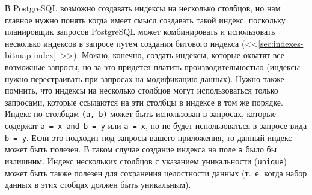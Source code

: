 В PostgreSQL возможно создавать индексы на несколько столбцов, но нам главное нужно понять когда имеет смысл создавать такой индекс, поскольку планировщик запросов PostgreSQL может комбинировать и использовать несколько индексов в запросе путем создания битового индекса (<<\ref{sec:indexes-bitmap-index}~>>). Можно, конечно, создать индексы, которые охватят все возможные запросы, но за это придется платить производительностью (индексы нужно перестраивать при запросах на модификацию данных). Нужно также помнить, что индексы на несколько столбцов могут использоваться только запросами, которые ссылаются на эти столбцы в индексе в том же порядке. Индекс по столбцам \lstinline!(a, b)! может быть использован в запросах, которые содержат \lstinline!a = x and b = y! или \lstinline!a = x!, но не будет использоваться в запросе вида \lstinline!b = y!. Если это подходит под запросы вашего приложения, то данный индекс может быть полезен. В таком случае создание индекса на поле \lstinline!a! было бы излишним. Индекс нескольких столбцов с указанием уникальности (\lstinline!unique!) может быть также полезен для сохранения целостности данных (т.~е. когда набор данных в этих стобцах должен быть уникальным).

